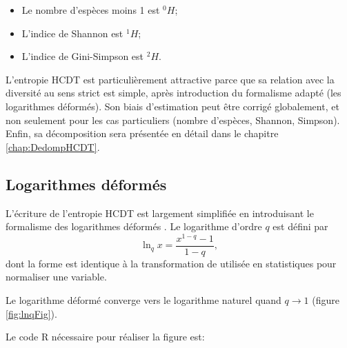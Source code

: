 \documentclass[
  11pt,
  french,
  a4paper,
  extrafontsizes,onecolumn,openright
  ]{memoir}
\providecommand{\tightlist}{%
  \setlength{\itemsep}{0pt}\setlength{\parskip}{0pt}}
\begin{document}
\begin{itemize}
\tightlist
\item
  Le nombre d'espèces moins 1 est \(^{0}\!H\);
\item
  L'indice de Shannon est \(^{1}\!H\);
\item
  L'indice de Gini-Simpson est \(^{2}\!H\).
\end{itemize}

L'entropie HCDT est particulièrement attractive parce que sa relation avec la diversité au sens strict est simple, après introduction du formalisme adapté (les logarithmes déformés).
Son biais d'estimation peut être corrigé globalement, et non seulement pour les cas particuliers (nombre d'espèces, Shannon, Simpson).
Enfin, sa décomposition sera présentée en détail dans le chapitre \ref{chap:DedompHCDT}.

\hypertarget{logarithmes-duxe9formuxe9s}{%
\subsection{Logarithmes déformés}\label{logarithmes-duxe9formuxe9s}}

L'écriture de l'entropie HCDT est largement simplifiée en introduisant le formalisme des logarithmes déformés \autocite{Tsallis1994}.
Le logarithme d'ordre \(q\) est défini par
\begin{equation}
  \label{eq:lnq}
  \ln_q{x} = \frac{x^{1-q}-1}{1-q},
\end{equation}
dont la forme est identique à la transformation de \textcite{Box1964} utilisée en statistiques pour normaliser une variable.

Le logarithme déformé converge vers le logarithme naturel quand \(q\to 1\) (figure \ref{fig:lnqFig}).

Le code R nécessaire pour réaliser la figure est:

\scriptsize
\end{document}
